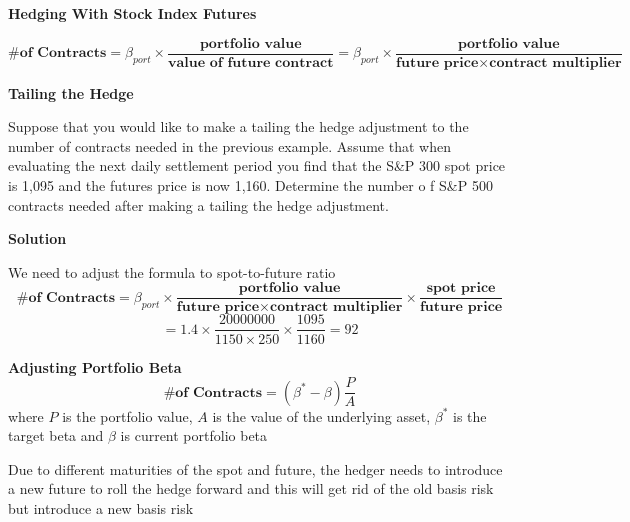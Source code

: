 \documentclass[11pt,fleqn]{book} %
\numberwithin{equation}{section} %
\numberwithin{figure}{section} %
\numberwithin{table}{section} %
\begin{document}
\begin{theorem}\textbf{Hedging With Stock Index Futures}

$$
\textbf{\# of Contracts}=\beta_{port}\times\frac{\textbf{portfolio value}}{\textbf{value of future contract}}=\beta_{port}\times\frac{\textbf{portfolio value}}{\textbf{future price}\times\textbf{contract multiplier}}
$$
\end{theorem}
\begin{exercise}\textbf{Tailing the Hedge}

Suppose that you would like to make a tailing the hedge adjustment to the number of
contracts needed in the previous example. Assume that when evaluating the next daily
settlement period you find that the S\&P 300 spot price is 1,095 and the futures price is
now 1,160. Determine the number o f S\&P 500 contracts needed after making a tailing
the hedge adjustment.

\textbf{Solution}

We need to adjust the formula to spot-to-future ratio
$$
\textbf{\# of Contracts}=\beta_{port}\times\frac{\textbf{portfolio value}}{\textbf{future price}\times\textbf{contract multiplier}}\times\frac{\textbf{spot price}}{\textbf{future price}}
$$
$$
=1.4\times\frac{20000000}{1150\times 250}\times\frac{1095}{1160}=92
$$
\end{exercise}

\begin{theorem}\textbf{Adjusting Portfolio Beta}\\
$$
\textbf{\# of Contracts}=(\beta^*-\beta)\frac{P}{A}
$$
where $P$ is the portfolio value, $A$ is the value of the underlying asset, $\beta^*$ is the target beta and $\beta$ is current portfolio beta
\end{theorem}
\begin{remark}
Due to different maturities of the spot and future, the hedger needs to introduce a new future to roll the hedge forward and this will get rid of the old basis risk but introduce a new basis risk
\end{remark}
\end{document}
